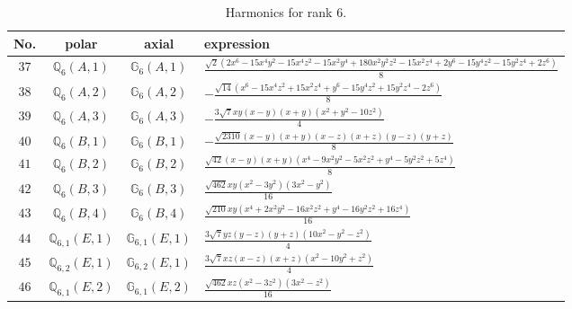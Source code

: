 \documentclass[fleqn,8pt,landscape]{jsarticle}
\begin{document}
\begin{table}[ht!]
\begin{center}
\caption{Harmonics for rank 6.}
\renewcommand{\arraystretch}{1.3}
\begin{tabular}{cccl} \hline \hline
No. & polar & axial & expression \\ \hline
$ 37 $ & $ \mathbb{Q}_{6}(A,1) $ & $ \mathbb{G}_{6}(A,1) $ & $ \frac{\sqrt{2} \left(2 x^{6} - 15 x^{4} y^{2} - 15 x^{4} z^{2} - 15 x^{2} y^{4} + 180 x^{2} y^{2} z^{2} - 15 x^{2} z^{4} + 2 y^{6} - 15 y^{4} z^{2} - 15 y^{2} z^{4} + 2 z^{6}\right)}{8} $ \\
$ 38 $ & $ \mathbb{Q}_{6}(A,2) $ & $ \mathbb{G}_{6}(A,2) $ & $ - \frac{\sqrt{14} \left(x^{6} - 15 x^{4} z^{2} + 15 x^{2} z^{4} + y^{6} - 15 y^{4} z^{2} + 15 y^{2} z^{4} - 2 z^{6}\right)}{8} $ \\
$ 39 $ & $ \mathbb{Q}_{6}(A,3) $ & $ \mathbb{G}_{6}(A,3) $ & $ - \frac{3 \sqrt{7} x y \left(x - y\right) \left(x + y\right) \left(x^{2} + y^{2} - 10 z^{2}\right)}{4} $ \\
$ 40 $ & $ \mathbb{Q}_{6}(B,1) $ & $ \mathbb{G}_{6}(B,1) $ & $ - \frac{\sqrt{2310} \left(x - y\right) \left(x + y\right) \left(x - z\right) \left(x + z\right) \left(y - z\right) \left(y + z\right)}{8} $ \\
$ 41 $ & $ \mathbb{Q}_{6}(B,2) $ & $ \mathbb{G}_{6}(B,2) $ & $ \frac{\sqrt{42} \left(x - y\right) \left(x + y\right) \left(x^{4} - 9 x^{2} y^{2} - 5 x^{2} z^{2} + y^{4} - 5 y^{2} z^{2} + 5 z^{4}\right)}{8} $ \\
$ 42 $ & $ \mathbb{Q}_{6}(B,3) $ & $ \mathbb{G}_{6}(B,3) $ & $ \frac{\sqrt{462} x y \left(x^{2} - 3 y^{2}\right) \left(3 x^{2} - y^{2}\right)}{16} $ \\
$ 43 $ & $ \mathbb{Q}_{6}(B,4) $ & $ \mathbb{G}_{6}(B,4) $ & $ \frac{\sqrt{210} x y \left(x^{4} + 2 x^{2} y^{2} - 16 x^{2} z^{2} + y^{4} - 16 y^{2} z^{2} + 16 z^{4}\right)}{16} $ \\
$ 44 $ & $ \mathbb{Q}_{6,1}(E,1) $ & $ \mathbb{G}_{6,1}(E,1) $ & $ \frac{3 \sqrt{7} y z \left(y - z\right) \left(y + z\right) \left(10 x^{2} - y^{2} - z^{2}\right)}{4} $ \\
$ 45 $ & $ \mathbb{Q}_{6,2}(E,1) $ & $ \mathbb{G}_{6,2}(E,1) $ & $ \frac{3 \sqrt{7} x z \left(x - z\right) \left(x + z\right) \left(x^{2} - 10 y^{2} + z^{2}\right)}{4} $ \\
$ 46 $ & $ \mathbb{Q}_{6,1}(E,2) $ & $ \mathbb{G}_{6,1}(E,2) $ & $ \frac{\sqrt{462} x z \left(x^{2} - 3 z^{2}\right) \left(3 x^{2} - z^{2}\right)}{16} $ \\

\end{tabular}
\end{center}
\end{table}
\end{document}
